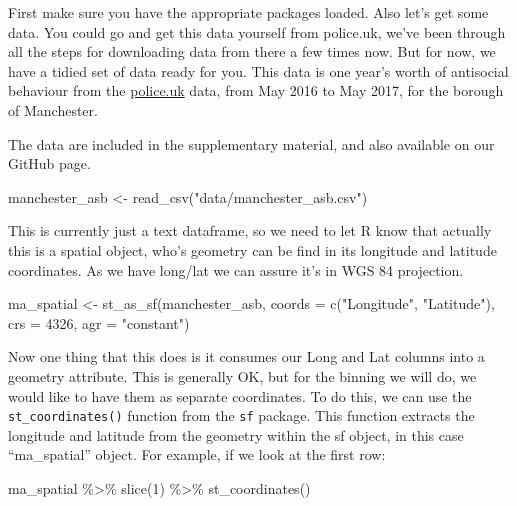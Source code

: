 \documentclass[
]{book}
\newenvironment{Shaded}{\begin{snugshade}}{\end{snugshade}}
\newcommand{\AttributeTok}[1]{\textcolor[rgb]{0.77,0.63,0.00}{#1}}
\newcommand{\DecValTok}[1]{\textcolor[rgb]{0.00,0.00,0.81}{#1}}
\newcommand{\FunctionTok}[1]{\textcolor[rgb]{0.00,0.00,0.00}{#1}}
\newcommand{\NormalTok}[1]{#1}
\newcommand{\OtherTok}[1]{\textcolor[rgb]{0.56,0.35,0.01}{#1}}
\newcommand{\SpecialCharTok}[1]{\textcolor[rgb]{0.00,0.00,0.00}{#1}}
\newcommand{\StringTok}[1]{\textcolor[rgb]{0.31,0.60,0.02}{#1}}
\begin{document}
First make sure you have the appropriate packages loaded. Also let's get some data. You could go and get this data yourself from police.uk, we've been through all the steps for downloading data from there a few times now. But for now, we have a tidied set of data ready for you. This data is one year's worth of antisocial behaviour from the \href{data.police.uk}{police.uk} data, from May 2016 to May 2017, for the borough of Manchester.

The data are included in the supplementary material, and also available on our GitHub page.

\begin{Shaded}
\begin{Highlighting}[]
\NormalTok{manchester\_asb }\OtherTok{\textless{}{-}} \FunctionTok{read\_csv}\NormalTok{(}\StringTok{"data/manchester\_asb.csv"}\NormalTok{)}
\end{Highlighting}
\end{Shaded}

This is currently just a text dataframe, so we need to let R know that actually this is a spatial object, who's geometry can be find in its longitude and latitude coordinates. As we have long/lat we can assure it's in WGS 84 projection.

\begin{Shaded}
\begin{Highlighting}[]
\NormalTok{ma\_spatial }\OtherTok{\textless{}{-}} \FunctionTok{st\_as\_sf}\NormalTok{(manchester\_asb, }
                       \AttributeTok{coords =} \FunctionTok{c}\NormalTok{(}\StringTok{"Longitude"}\NormalTok{, }\StringTok{"Latitude"}\NormalTok{),}
                       \AttributeTok{crs =} \DecValTok{4326}\NormalTok{, }
                       \AttributeTok{agr =} \StringTok{"constant"}\NormalTok{)}
\end{Highlighting}
\end{Shaded}

Now one thing that this does is it consumes our Long and Lat columns into a geometry attribute. This is generally OK, but for the binning we will do, we would like to have them as separate coordinates. To do this, we can use the \texttt{st\_coordinates()} function from the \texttt{sf} package. This function extracts the longitude and latitude from the geometry within the sf object, in this case ``ma\_spatial'' object. For example, if we look at the first row:

\begin{Shaded}
\begin{Highlighting}[]
\NormalTok{ma\_spatial }\SpecialCharTok{\%\textgreater{}\%} 
  \FunctionTok{slice}\NormalTok{(}\DecValTok{1}\NormalTok{) }\SpecialCharTok{\%\textgreater{}\%} 
  \FunctionTok{st\_coordinates}\NormalTok{()}
\end{Highlighting}
\end{Shaded}
\end{document}

